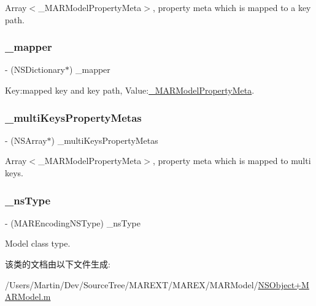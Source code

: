 Array$<$\+\_\+\+M\+A\+R\+Model\+Property\+Meta$>$, property meta which is mapped to a key path. 

\mbox{\label{interface___m_a_r_model_meta_af00312d68b9271700afe0c978de3fca9}} 
\subsubsection{\texorpdfstring{\+\_\+mapper}{\_mapper}}
{\footnotesize\ttfamily -\/ (N\+S\+Dictionary$\ast$) \+\_\+mapper\hspace{0.3cm}{\ttfamily [protected]}}



Key\+:mapped key and key path, Value\+:\hyperlink{interface___m_a_r_model_property_meta}{\+\_\+\+M\+A\+R\+Model\+Property\+Meta}. 

\mbox{\label{interface___m_a_r_model_meta_a599aa3e73277c70a71d195288afa184a}} 
\subsubsection{\texorpdfstring{\+\_\+multi\+Keys\+Property\+Metas}{\_multiKeysPropertyMetas}}
{\footnotesize\ttfamily -\/ (N\+S\+Array$\ast$) \+\_\+multi\+Keys\+Property\+Metas\hspace{0.3cm}{\ttfamily [protected]}}



Array$<$\+\_\+\+M\+A\+R\+Model\+Property\+Meta$>$, property meta which is mapped to multi keys. 

\mbox{\label{interface___m_a_r_model_meta_a2310ec6db8b508fd0327bd52df954ea0}} 
\subsubsection{\texorpdfstring{\+\_\+ns\+Type}{\_nsType}}
{\footnotesize\ttfamily -\/ (M\+A\+R\+Encoding\+N\+S\+Type) \+\_\+ns\+Type\hspace{0.3cm}{\ttfamily [protected]}}



Model class type. 



该类的文档由以下文件生成\+:\begin{DoxyCompactItemize}
\item 
/\+Users/\+Martin/\+Dev/\+Source\+Tree/\+M\+A\+R\+E\+X\+T/\+M\+A\+R\+E\+X/\+M\+A\+R\+Model/\hyperlink{_n_s_object_09_m_a_r_model_8m}{N\+S\+Object+\+M\+A\+R\+Model.\+m}\end{DoxyCompactItemize}
